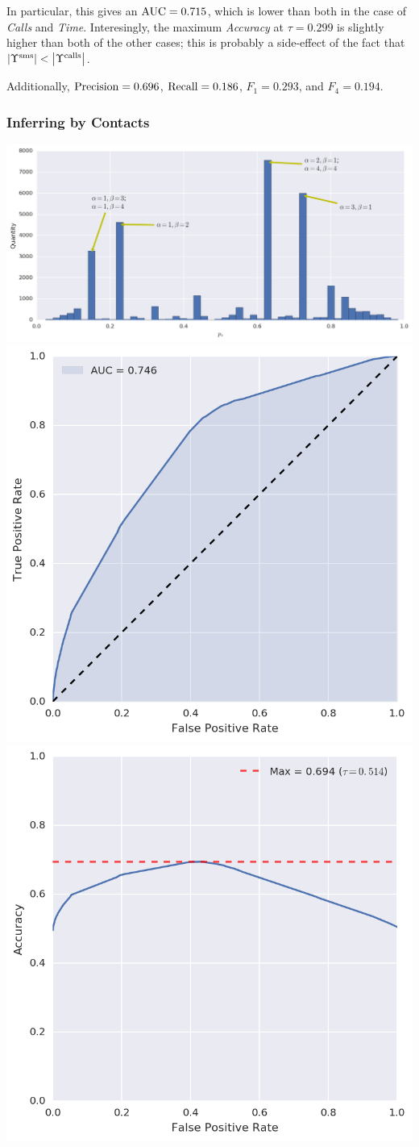 In particular, this gives an $\operatorname{AUC} = 0.715$, which is lower than both in the case of \emph{Calls} and \emph{Time}. Interesingly, the maximum \emph{Accuracy} at $\tau = 0.299$ is slightly higher than both of the other cases; this is probably a side-effect of the fact that $\left| \Upsilon^{\operatorname{sms}} \right| < \left| \Upsilon^{\operatorname{calls}} \right|$.

Additionally, $\operatorname{Precision} = 0.696$, $\operatorname{Recall} = 0.186$, $F_1 = 0.293$, and $F_4 = 0.194$.

\newpage
\subsubsection{Inferring by Contacts}
\label{subsec:contacts_infer}

\begin{center}
\includegraphics[width=\textwidth]{figures/bayes/hist_contacts.png}
\includegraphics[width=.49\textwidth]{figures/bayes/roc_contacts.png}
\includegraphics[width=.49\textwidth]{figures/bayes/accuracy_contacts.png}
\end{center}

